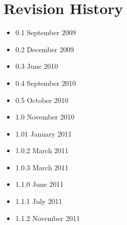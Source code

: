 \documentclass[11pt]{article}
\begin{document}
\section*{Revision History}
\begin{itemize}
\item 0.1 September 2009
\item 0.2 December 2009
\item 0.3 June 2010
\item 0.4 September 2010
\item 0.5 October 2010
\item 1.0 November 2010
\item 1.01 January 2011
\item 1.0.2 March 2011
\item 1.0.3 March 2011
\item 1.1.0 June 2011
\item 1.1.1 July 2011
\item 1.1.2 November 2011
\end{itemize}



\end{document}
